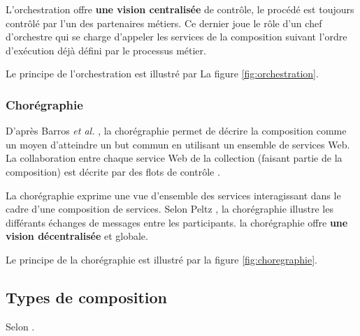         L'orchestration offre \textbf{une vision centralisée} de
        contrôle, le procédé est toujours contrôlé par l'un des
        partenaires métiers. Ce dernier joue le rôle d'un chef
        d'orchestre qui se charge d'appeler les services de la
        composition suivant l'ordre d'exécution déjà défini par le
        processus métier.

        Le principe de l'orchestration est illustré
        par La figure \ref{fig:orchestration}.

        

        \subsubsection{Chorégraphie}
        \label{sec:choregraphie}

        D'après Barros \emph{et al.} \cite{barros2006standards}, la
        chorégraphie permet de décrire la composition comme un moyen
        d'atteindre un but commun en utilisant un ensemble de services
        Web. La collaboration entre chaque service Web de la
        collection (faisant partie de la composition) est décrite par
        des flots de contrôle \cite{lopez2008selection}.

        La chorégraphie exprime une vue d'ensemble des services
        interagissant dans le cadre d'une composition de
        services. Selon Peltz \cite{peltz2003web}, la chorégraphie
        illustre les différants échanges de messages entre les
        participants. la chorégraphie offre \textbf{une vision
          décentralisée} et globale.

        Le principe de la chorégraphie est illustré par la figure
        \ref{fig:choregraphie}.
        


      \subsection{Types de composition}
      \label{sec:types-de-composition}
      Selon \cite{fluegge2006challenges}.


